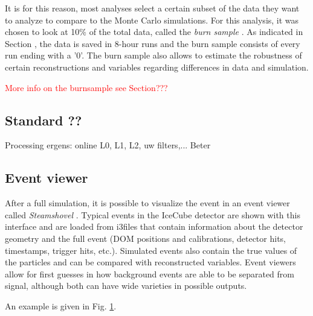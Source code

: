\noindent It is for this reason, most analyses select a certain subset of the data they want to analyze to compare to the Monte Carlo simulations. For this analysis, it was chosen to look at 10\% of the total data, called the \textit{burn sample} . As indicated in Section \cite{subsec:datahandling}, the data is saved in 8-hour runs and the burn sample consists of every run ending with a '0'. The burn sample also allows to estimate the robustness of certain reconstructions and variables regarding differences in data and simulation.


\textcolor{red}{More info on the burnsample see Section???\\}

\subsection{Standard ??}
\noindent Processing ergens: online L0, L1, L2, uw filters,... Beter

\subsection{Event viewer}
After a full simulation, it is possible to visualize the event in an event viewer called \textit{Steamshovel} . Typical events in the IceCube detector are shown with this interface and are loaded from i3files that contain information about the detector geometry and the full event (DOM positions and calibrations, detector hits, timestamps, trigger hits, etc.). Simulated events also contain the true values of the particles and can be compared with reconstructed variables. Event viewers allow for first guesses in how background events are able to be separated from signal, although both can have wide varieties in possible outputs.

An example is given in Fig. \ref{fig:steamshovel}.

\begin{figure}
\centering
\caption{}
\label{fig:steamshovel}
\end{figure}